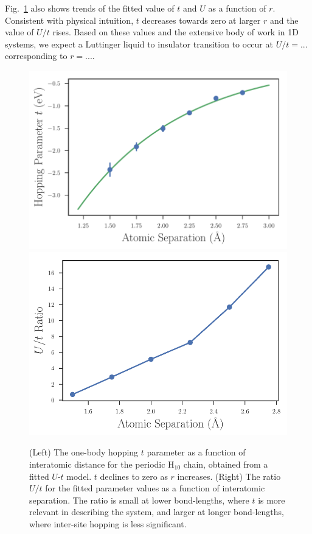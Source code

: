 Fig.~\ref{fig:Parameters-vs-Bond-t} also shows trends of the fitted value of $t$ 
and $U$ as a function of $r$. Consistent with physical intuition, $t$ decreases towards zero at larger $r$
and the value of $U/t$ rises. Based on these values and the extensive body of work in 1D systems, we expect a Luttinger liquid 
to insulator transition to occur at $U/t=...$ corresponding to $r=...$.  

\begin{figure}
\centering
\includegraphics[scale=0.5]{./Figures/fitted_t_values_no_annotate_h10_chain.pdf}
\includegraphics[scale=0.5]{./Figures/Ust_ratio_vs_separation_h_chain.pdf}
\caption{ (Left) The one-body hopping $t$ parameter as a function of interatomic distance for the periodic H$_{10}$ chain, obtained from a fitted $U$-$t$ model. $t$ declines to zero as $r$ increases. (Right) The ratio $U/t$ for the fitted parameter values as a function of interatomic separation. The ratio is small at lower bond-lengths, where $t$ is more relevant in describing the system, and larger at longer bond-lengths, where inter-site hopping is less significant. }\label{fig:Parameters-vs-Bond-t}
\end{figure}
